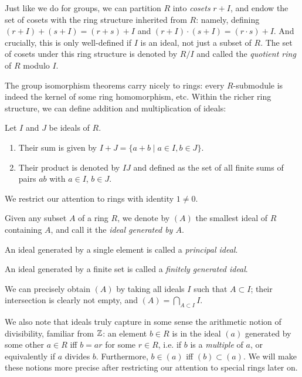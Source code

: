 Just like we do for groups, we can partition $R$ into \emph{cosets} $r+I$, and endow the set of cosets with the ring structure inherited from $R$: namely, defining $(r+I)+(s+I)=(r+s)+I$ and $(r+I)\cdot (s+I) = (r\cdot s) + I$. And crucially, this is only well-defined if $I$ is an ideal, not just a subset of $R$. The set of cosets under this ring structure is denoted by $R/I$ and called the \emph{quotient ring} of $R$ modulo $I$.

The group isomorphism theorems carry nicely to rings: every $R$-submodule is indeed the kernel of some ring homomorphism, etc. Within the richer ring structure, we can define addition and multiplication of ideals:

\begin{defn}
	Let $I$ and $J$ be ideals of $R$.
	\begin{enumerate}[(1)]
		\item Their sum is given by $I+J=\{a+b \mid a\in I, b\in J\}$.
		\item Their product is denoted by $IJ$ and defined as the set of all finite sums of pairs $ab$ with $a\in I$, $b\in J$.
	\end{enumerate}
\end{defn}

We restrict our attention to rings with identity $1\neq 0$.

\begin{defn}
	Given any subset $A$ of a ring $R$, we denote by $(A)$ the smallest ideal of $R$ containing $A$, and call it the \emph{ideal generated by $A$}.

	An ideal generated by a single element is called a \emph{principal ideal}.

	An ideal generated by a finite set is called a \emph{finitely generated ideal}.
\end{defn}

We can precisely obtain $(A)$ by taking all ideals $I$ such that $A\subset I$; their intersection is clearly not empty, and $(A)=\bigcap_{A\subset I} I$.

We also note that ideals truly capture in some sense the arithmetic notion of divisibility, familiar from $\mathbb{Z}$: an element $b\in R$ is in the ideal $(a)$ generated by some other $a\in R$ iff $b=ar$ for some $r\in R$, i.e. if $b$ is a \emph{multiple} of $a$, or equivalently if $a$ divides $b$. Furthermore, $b\in(a)$ iff $(b)\subset(a)$. We will make these notions more precise after restricting our attention to special rings later on.

